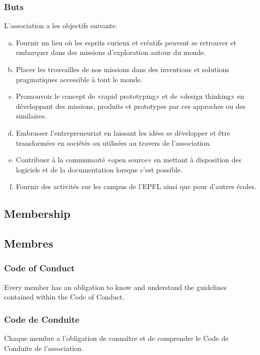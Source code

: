 \documentclass[12pt,a4paper,oneside]{article}
\newcounter{art}
\newcommand{\english}{    \switchcolumn[0]\noindent}
\newcommand{\french}{    \switchcolumn[1]\noindent}
\begin{document}
\begin{paracol}{2}
	\subsubsection{Buts}
	L’association a les objectifs suivants:
	\begin{enumerate}[(a)]
		\item Fournir un lieu où les esprits curieux et créatifs peuvent se retrouver et embarquer dans des missions d’exploration autour du monde.
		\item Placer les trouvailles de nos missions dans des inventions et solutions pragmatiques accessible à tout le monde.
		\item Promouvoir le concept de «rapid prototyping» et de «design thinking» en développant des missions, produits et prototypes par ces approches ou des similaires.
		\item Embrasser l’entrepreneuriat en laissant les idées se développer et être transformées en sociétés ou utilisées au travers de l’association.
		\item Contribuer à la communauté «open source» en mettant à disposition des logiciels et de la documentation lorsque c’est possible.
		\item Fournir des activités sur les campus de l’EPFL ainsi que pour d’autres écoles.

	\end{enumerate}



\english
	\subsection{Membership}

\french 
	\subsection{Membres}

\english
	\subsubsection{Code of Conduct}
	Every member has an obligation to know and understand the guidelines contained within the Code of Conduct.
\french
	\subsubsection{Code de Conduite}
	Chaque membre a l’obligation de connaître et de comprendre le Code de Conduite de l'association.



\end{paracol}
\end{document}
